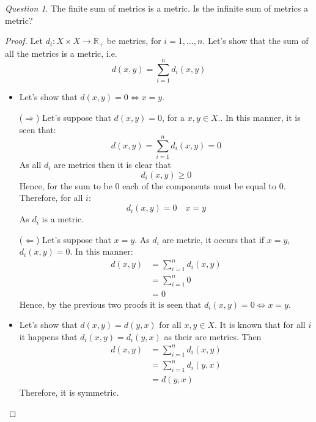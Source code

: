 \documentclass[11pt]{article}
\theoremstyle{definition}
\theoremstyle{remark}
\theoremstyle{remark}
\theoremstyle{remark}
\newtheorem*{question}{Question}
\newcommand{\R}{{\mathbb{R}}}
\begin{document}
\begin{question}
  The finite sum of metrics is a metric. Is the infinite sum of metrics a
  metric?
\end{question}
\begin{proof}
  Let $d_{i}: X \times X \rightarrow \R_{+}$ be metrics, for $i = 1,\ldots,n$.
  Let's show that the sum of all the metrics is a metric, i.e.
  \begin{equation*}
    d(x, y) = \sum_{i=1}^{n}d_{i}(x,y)
  \end{equation*}
  \begin{itemize}
    \item Let's show that $d(x,y) = 0 \iff x = y$.

      ($\Rightarrow$) Let's suppose that $d(x,y) = 0$, for a $x,y \in X$.. In
      this manner, it is seen that:
      \begin{equation*}
        d(x,y) = \sum_{i = 1}^{n} d_{i}(x,y) = 0
      \end{equation*}
      As all $d_{i}$ are metrics then it is clear that
      \begin{equation*}
        d_{i}(x,y) \ge 0
      \end{equation*}
      Hence, for the sum to be 0 each of the components must be equal to 0.
      Therefore, for all $i$:
      \begin{equation*}
        d_{i}(x, y) = 0 \quad x = y
      \end{equation*}
      As $d_{i}$ is a metric.

      ($\Leftarrow$) Let's suppose that $x = y$. As $d_{i}$ are metric, it
      occurs that if $x = y$, $d_{i}(x, y) = 0$. In this manner:
      \begin{align*}
        d(x,y) &= \sum_{i = 1}^{n}d_{i}(x, y) \\
               &= \sum_{i=1}^{n} 0 \\
               &= 0
      \end{align*}
      Hence, by the previous two proofs it is seen that
      $d_{i}(x,y) = 0 \iff x = y$.

    \item Let's show that $d(x,y) = d(y, x)$ for all $x, y \in X$. It is known
      that for all $i$ it happens that $d_{i}(x,y) = d_{i}(y,x)$ as their are
      metrics. Then
      \begin{align*}
        d(x,y) &= \sum_{i=1}^{n} d_{i}(x, y) \\
               &= \sum_{i=1}^{n} d_{i}(y, x) \\
               &= d(y, x)
      \end{align*}
      Therefore, it is symmetric.


\end{itemize}
\end{proof}
\end{document}
